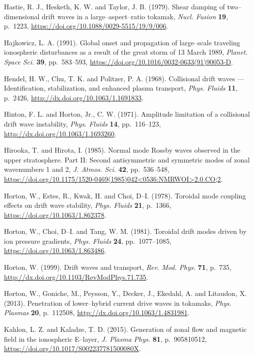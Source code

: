 \documentclass[a4paper,openany,12pt]{report}
\begin{document}
\begin{thebibliography}{100}
\bibitem{}
Hastie, R. J., Hesketh, K. W. and Taylor, J. B. (1979). Shear damping of two--dimensional drift waves in a large--aspect--ratio tokamak, \emph{Nucl. Fusion} \textbf{19}, p.~1223, \url{https://doi.org/10.1088/0029-5515/19/9/006}.

\bibitem{}
Hajkowicz, L. A. (1991). Global onset and propagation of large--scale traveling ionospheric disturbances as a result of the great storm of 13 March 1989, \emph{Planet. Space Sci.} \textbf{39}, pp.~583--593, \url{https://doi.org/10.1016/0032-0633(91)90053-D}.

\bibitem{}
Hendel, H. W., Chu, T. K. and Politzer, P. A. (1968). Collisional drift waves --- Identification, stabilization, and enhanced plasma transport, \emph{Phys. Fluids} \textbf{11}, p.~2426, \url{http://dx.doi.org/10.1063/1.1691833}.

\bibitem{}
Hinton, F. L. and Horton, Jr., C. W. (1971). Amplitude limitation of a collisional drift wave instability, \emph{Phys. Fluids} \textbf{14}, pp.~116--123, \url{http://dx.doi.org/10.1063/1.1693260}.

\bibitem{}
Hirooka, T. and Hirota, I. (1985). Normal mode Rossby waves observed in the upper stratosphere. Part II: Second antisymmetric and symmetric modes of zonal wavenumbers 1 and 2, {\it J. Atmos. Sci.} \textbf{42}, 
pp.~536--548, \url{https://doi.org/10.1175/1520-0469(1985)042<0536:NMRWOI>2.0.CO;2}.

\bibitem{}
Horton, W., Estes, R., Kwak, H. and Choi, D--I. (1978). Toroidal mode coupling effects on drift wave stability, \emph{Phys. Fluids} \textbf{21}, p.~1366, \url{https://doi.org/10.1063/1.862378}.

\bibitem{}
Horton, W., Choi, D--I. and Tang, W. M. (1981). Toroidal drift modes driven by ion pressure gradients, \emph{Phys. Fluids} \textbf{24}, pp.~1077--1085, \url{https://doi.org/10.1063/1.863486}.

\bibitem{}
Horton, W. (1999). Drift waves and transport, \emph{Rev. Mod. Phys.} \textbf{71}, p.~735, \url{http://dx.doi.org/10.1103/RevModPhys.71.735}.

\bibitem{}
Horton, W., Goniche, M., Peysson, Y., Decker, J., Ekedahl, A. and Litaudon, X. (2013). Penetration of lower--hybrid current drive waves in tokamaks, \emph{Phys. Plasmas} \textbf{20}, p.~112508, \url{http://dx.doi.org/10.1063/1.4831981}.

\bibitem{}
Kahlon, L. Z. and Kaladze, T. D. (2015). Generation of zonal flow and magnetic field in the ionospheric E--layer, \emph{J. Plasma Phys.} \textbf{81}, p.~905810512, \url{https://doi.org/10.1017/S002237781500080X}.


\end{thebibliography}
\end{document}
